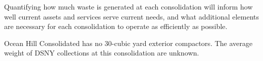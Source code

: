 
    Quantifying how much waste is generated at each consolidation will inform how well current assets and services serve current needs, and what additional elements are necessary for each consolidation to operate as efficiently as possible.
    
    Ocean Hill Consolidated has no 30-cubic yard exterior compactors. The average weight of DSNY collections at this consolidation are unknown.